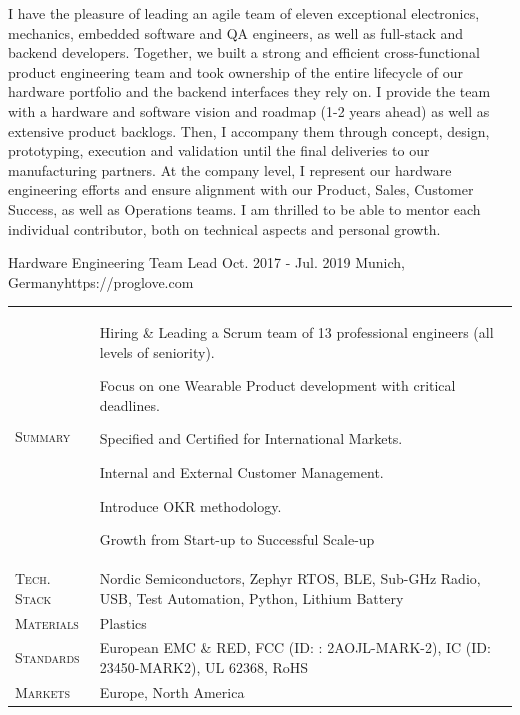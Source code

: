 \documentclass[10pt,a4paper]{moderncv}
\begin{document}
  \begin{minipage}{\textwidth}
    \small
    I have the pleasure of leading an agile team of eleven exceptional electronics, mechanics, embedded software and QA engineers, as well as full-stack and backend developers. Together, we built a strong and efficient cross-functional product engineering team and took ownership of the entire lifecycle of our hardware portfolio and the backend interfaces they rely on. I provide the team with a hardware and software vision and roadmap (1-2 years ahead) as well as extensive product backlogs. Then, I accompany them through concept, design, prototyping, execution and validation until the final deliveries to our manufacturing partners. At the company level, I represent our hardware engineering efforts and ensure alignment with our Product, Sales, Customer Success, as well as Operations teams. I am thrilled to be able to mentor each individual contributor, both on technical aspects and personal growth.
  \end{minipage}
  

  {Hardware Engineering Team Lead}
  {Oct. 2017 - Jul. 2019}
  {Munich, Germany}{https://proglove.com}

  \begin{tabularx}{\textwidth}{>{\scshape}l@{\hskip 3.5mm}L}
    Summary & Hiring \& Leading a Scrum team of 13 professional engineers (all levels of seniority).
    \par Focus on one Wearable Product development with critical deadlines.
    \par Specified and Certified for International Markets.
    \par Internal and External Customer Management. 
    \par Introduce OKR methodology.
    \par Growth from Start-up to Successful Scale-up\\
    Tech. Stack & Nordic Semiconductors, Zephyr RTOS, BLE, Sub-GHz Radio, USB, Test Automation, Python, Lithium Battery\\
    Materials & Plastics\\
    Standards & European EMC \& RED, FCC (ID: : 2AOJL-MARK-2), IC (ID: 23450-MARK2), UL 62368, RoHS\\
    Markets & Europe, North America\\
  \end{tabularx}

  \vspace{1.5em}
  
\end{document}
